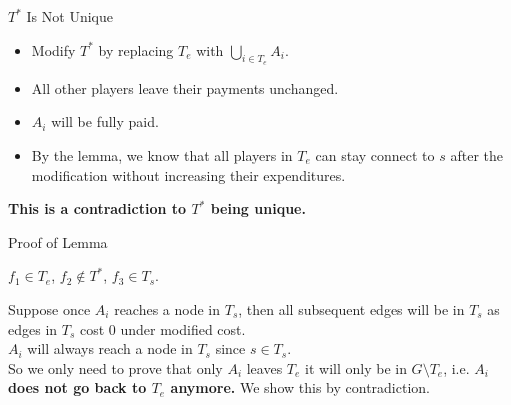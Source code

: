 \documentclass[11pt,aspectratio=169]{beamer}
\begin{document}
\begin{frame}{$T^*$ Is Not Unique}
    \begin{itemize}
    \item Modify $T^*$ by replacing $T_e$ with \(\bigcup_{i\in T_e} A_i\).
    \item All other players leave their payments unchanged.
    \item $A_i$ will be fully paid. 
    \item By the lemma, we know that all players in $T_e$ can stay connect to $s$ after the modification without increasing their expenditures.
    \end{itemize}

    \textbf{This is a contradiction to $T^*$ being unique.}
\end{frame}

\begin{frame}{Proof of Lemma}
    \begin{lemma}
        \(f_1 \in T_e\), \(f_2 \notin T^*\), \(f_3 \in T_s\).
    \end{lemma}
    \vspace{10pt}

    Suppose once $A_i$ reaches a node in $T_s$, then all subsequent edges will be in $T_s$ as edges in $T_s$ cost 0 under modified cost. \\
    \vspace{10pt}
    $A_i$ will always reach a node in $T_s$ since $s \in T_s$.\\
    \vspace{10pt}
    So we only need to prove that only $A_i$ leaves $T_e$ it will only be in $G\setminus T_e$, i.e. \textbf{$A_i$ does not go back to $T_e$ anymore.} We show this by contradiction. 
\end{frame}
\end{document}
